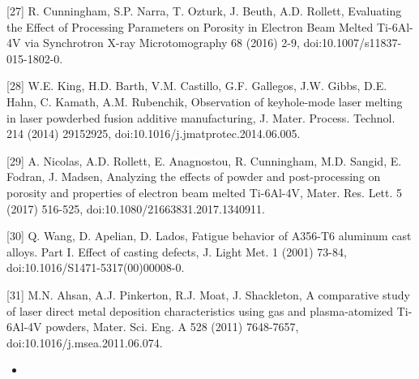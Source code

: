 \documentclass[10pt]{article}
\begin{document}
[27] R. Cunningham, S.P. Narra, T. Ozturk, J. Beuth, A.D. Rollett, Evaluating the Effect of Processing Parameters on Porosity in Electron Beam Melted Ti-6Al-4V via Synchrotron X-ray Microtomography 68 (2016) 2-9, doi:10.1007/s11837-015-1802-0.

[28] W.E. King, H.D. Barth, V.M. Castillo, G.F. Gallegos, J.W. Gibbs, D.E. Hahn, C. Kamath, A.M. Rubenchik, Observation of keyhole-mode laser melting in laser powderbed fusion additive manufacturing, J. Mater. Process. Technol. 214 (2014) 29152925, doi:10.1016/j.jmatprotec.2014.06.005.

[29] A. Nicolas, A.D. Rollett, E. Anagnostou, R. Cunningham, M.D. Sangid, E. Fodran, J. Madsen, Analyzing the effects of powder and post-processing on porosity and properties of electron beam melted Ti-6Al-4V, Mater. Res. Lett. 5 (2017) 516-525, doi:10.1080/21663831.2017.1340911.

[30] Q. Wang, D. Apelian, D. Lados, Fatigue behavior of A356-T6 aluminum cast alloys. Part I. Effect of casting defects, J. Light Met. 1 (2001) 73-84, doi:10.1016/S1471-5317(00)00008-0.

[31] M.N. Ahsan, A.J. Pinkerton, R.J. Moat, J. Shackleton, A comparative study of laser direct metal deposition characteristics using gas and plasma-atomized Ti-6Al-4V powders, Mater. Sci. Eng. A 528 (2011) 7648-7657, doi:10.1016/j.msea.2011.06.074.

\begin{itemize}
  \item 
\end{itemize}
\end{document}
